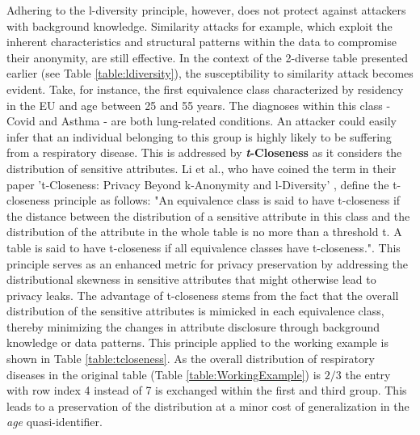 Adhering to the l-diversity principle, however, does not protect against attackers with background knowledge. Similarity attacks for example, which exploit the inherent characteristics and structural patterns within the data to compromise their anonymity, are still effective. In the context of the 2-diverse table presented earlier (see Table \ref{table:ldiversity}), the susceptibility to similarity attack becomes evident. Take, for instance, the first equivalence class characterized by residency in the EU and age between 25 and 55 years. The diagnoses within this class - Covid and Asthma - are both lung-related conditions. An attacker could easily infer that an individual belonging to this group is highly likely to be suffering from a respiratory disease. This is addressed by \textbf{\textit{t}-Closeness} as it considers the distribution of sensitive attributes. Li et al., who have coined the term in their paper 't-Closeness: Privacy Beyond k-Anonymity and l-Diversity' \cite{li2007tcloseness}, define the t-closeness principle as follows: "An equivalence class is said to have t-closeness if the distance between the distribution of a sensitive attribute in this class and the distribution of the attribute in the whole table is no more than a threshold t. A table is said to have t-closeness if all equivalence classes have t-closeness.". This principle serves as an enhanced metric for privacy preservation by addressing the distributional skewness in sensitive attributes that might otherwise lead to privacy leaks. The advantage of t-closeness stems from the fact that the overall distribution of the sensitive attributes is mimicked in each equivalence class, thereby minimizing the changes in attribute disclosure through background knowledge or data patterns. This principle applied to the working example is shown in Table \ref{table:tcloseness}. As the overall distribution of respiratory diseases in the original table (Table \ref{table:WorkingExample}) is $2/3$ the entry with row index 4 instead of 7 is exchanged within the first and third group. This leads to a preservation of the distribution at a minor cost of generalization in the \textit{age} quasi-identifier. 

